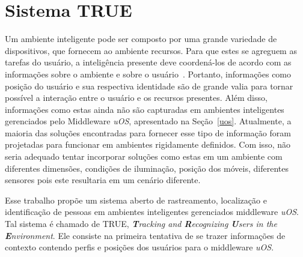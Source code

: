 \chapter{Sistema TRUE}
\label{cap:true}




Um ambiente inteligente pode ser composto por uma grande variedade de dispositivos, que fornecem ao ambiente recursos. Para que estes se agreguem as tarefas do usuário, a inteligência presente deve coordená-los de acordo com as informações sobre o ambiente e sobre o usuário~\cite{fabriciobuzzeto}. Portanto, informações como posição do usuário e sua respectiva identidade são de grande valia para tornar possível a interação entre o usuário e os recursos presentes. Além disso, informações como estas ainda não são capturadas em ambientes inteligentes gerenciados pelo Middleware \textit{uOS}, apresentado na Seção~\ref{uos}. Atualmente, a maioria das soluções encontradas para fornecer esse tipo de informação foram projetadas para funcionar em ambientes rigidamente definidos. Com isso, não seria adequado tentar incorporar soluções como estas em um ambiente com diferentes dimensões, condições de iluminação, posição dos móveis, diferentes sensores pois este resultaria em um cenário diferente.

Esse trabalho propõe um sistema aberto de rastreamento, localização e identificação de pessoas em ambientes inteligentes gerenciados middleware \textit{uOS}. Tal sistema é chamado de TRUE, \textit{\textbf{T}racking and \textbf{R}ecognizing \textbf{U}sers in the \textbf{E}nvironment}. Ele consiste na primeira tentativa de se trazer informações de contexto contendo perfis e posições dos usuários para o middleware \textit{uOS}.



